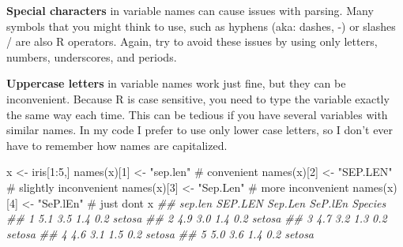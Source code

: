 \documentclass[
  13,
  letterpaper,
]{report}
\newenvironment{Shaded}{\begin{snugshade}}{\end{snugshade}}
\newcommand{\CommentTok}[1]{\textcolor[rgb]{0.37,0.37,0.37}{#1}}
\newcommand{\DecValTok}[1]{\textcolor[rgb]{0.68,0.00,0.00}{#1}}
\newcommand{\DocumentationTok}[1]{\textcolor[rgb]{0.37,0.37,0.37}{\textit{#1}}}
\newcommand{\FunctionTok}[1]{\textcolor[rgb]{0.28,0.35,0.67}{#1}}
\newcommand{\NormalTok}[1]{\textcolor[rgb]{0.00,0.23,0.31}{#1}}
\newcommand{\OtherTok}[1]{\textcolor[rgb]{0.00,0.23,0.31}{#1}}
\newcommand{\SpecialCharTok}[1]{\textcolor[rgb]{0.37,0.37,0.37}{#1}}
\newcommand{\StringTok}[1]{\textcolor[rgb]{0.13,0.47,0.30}{#1}}
\begin{document}
\textbf{Special characters} in variable names can cause issues with
parsing. Many symbols that you might think to use, such as hyphens (aka:
dashes, -) or slashes / are also R operators. Again, try to avoid these
issues by using only letters, numbers, underscores, and periods.

\begin{Shaded}
\end{Shaded}

\textbf{Uppercase letters} in variable names work just fine, but they
can be inconvenient. Because R is case sensitive, you need to type the
variable exactly the same way each time. This can be tedious if you have
several variables with similar names. In my code I prefer to use only
lower case letters, so I don't ever have to remember how names are
capitalized.

\begin{Shaded}
\begin{Highlighting}[]
\NormalTok{x }\OtherTok{\textless{}{-}}\NormalTok{ iris[}\DecValTok{1}\SpecialCharTok{:}\DecValTok{5}\NormalTok{,]}
\FunctionTok{names}\NormalTok{(x)[}\DecValTok{1}\NormalTok{] }\OtherTok{\textless{}{-}} \StringTok{"sep.len"} \CommentTok{\# convenient}
\FunctionTok{names}\NormalTok{(x)[}\DecValTok{2}\NormalTok{] }\OtherTok{\textless{}{-}} \StringTok{"SEP.LEN"} \CommentTok{\# slightly inconvenient}
\FunctionTok{names}\NormalTok{(x)[}\DecValTok{3}\NormalTok{] }\OtherTok{\textless{}{-}} \StringTok{"Sep.Len"} \CommentTok{\# more inconvenient}
\FunctionTok{names}\NormalTok{(x)[}\DecValTok{4}\NormalTok{] }\OtherTok{\textless{}{-}} \StringTok{"SeP.lEn"} \CommentTok{\# just don\textquotesingle{}t}
\NormalTok{x}
\DocumentationTok{\#\#   sep.len SEP.LEN Sep.Len SeP.lEn Species}
\DocumentationTok{\#\# 1     5.1     3.5     1.4     0.2  setosa}
\DocumentationTok{\#\# 2     4.9     3.0     1.4     0.2  setosa}
\DocumentationTok{\#\# 3     4.7     3.2     1.3     0.2  setosa}
\DocumentationTok{\#\# 4     4.6     3.1     1.5     0.2  setosa}
\DocumentationTok{\#\# 5     5.0     3.6     1.4     0.2  setosa}
\end{Highlighting}
\end{Shaded}
\end{document}
